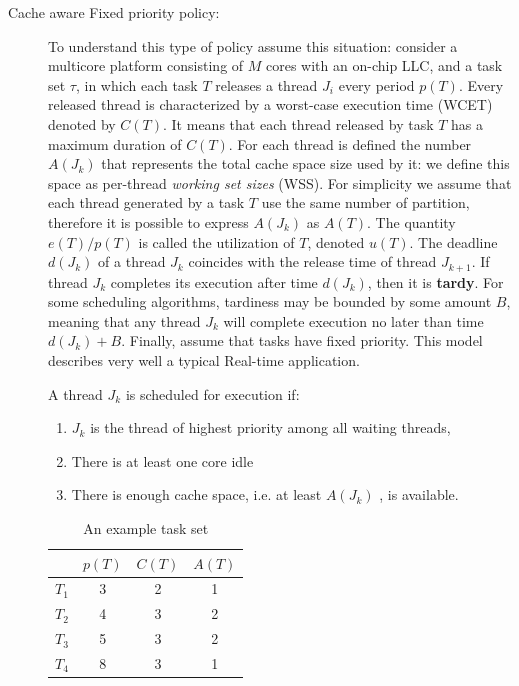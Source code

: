 \begin{description}
\item[Cache aware Fixed priority policy:] To understand this type of policy assume this situation: consider a multicore platform consisting of $M$ cores 
with an on-chip LLC, and a task set $\tau$, in which each task $T$ releases a thread $J_i$ every period $p(T)$. Every released thread is characterized by a 
worst-case execution time (WCET) denoted by $C(T)$. It means that each thread released by task $T$ has a maximum duration of $C(T)$. For each thread is 
defined the number $A(J_k)$ that represents the total cache space size used by it: we define this space as per-thread \textit{working set sizes} (WSS). 
For simplicity we assume that each thread generated by a task $T$ use the same number of partition, therefore it is possible to express $A(J_k)$ as $A(T)$. 
The quantity $e(T)/p(T)$ is called the utilization of $T$, denoted $u(T)$. The deadline $d(J_k)$ of a thread $J_k$ coincides with the release time of thread 
$J_{k+1}$. If thread $J_k$ completes its execution after time $d(J_k)$, then it is \textbf{tardy}. For some scheduling algorithms, tardiness may be bounded 
by some amount $B$, meaning that any thread $J_k$ will complete execution no later than time $d(J_k)+B$. Finally, assume that tasks have fixed priority.
This model describes very well a typical Real-time application.

A thread $J_k$ is scheduled for execution if:

\begin{enumerate}
	\item $J_k$ is the thread of highest priority among all waiting threads,
	\item There is at least one core idle
	\item There is enough cache space, i.e. at least $A(J_k)$ , is available.
\end{enumerate}

\begin{table}[htbp]
\begin{center}
\begin{tabular}{l|c|c|c}
	\hline
	& $p(T)$ & $C(T)$ & $A(T)$ \\ \hline
	$T_1$ & 3 & 2 & 1 \\ \hline
	$T_2$ & 4 & 3 & 2 \\ \hline
	$T_3$ & 5 & 3 & 2 \\ \hline
	$T_4$ & 8 & 3 & 1 \\ 
	\hline
\end{tabular}
\caption{An example task set}
\label{tab:cache_task_set}
\end{center}
\end{table}


\end{description}

